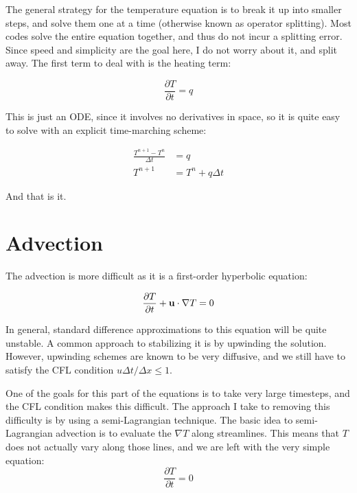 \documentclass[a4paper,10pt]{article}
\begin{document}
The general strategy for the temperature equation is to break it up into smaller steps, and solve them one at a time (otherwise known as operator splitting). 
Most codes solve the entire equation together, and thus do not incur a splitting error.  
Since speed and simplicity are the goal here, I do not worry about it, and split away.  The first term to deal with is the heating term:

\begin{equation}
\frac{\partial T}{\partial t} = q
\end{equation}

This is just an ODE, since it involves no derivatives in space, so it is quite easy to solve with an explicit time-marching scheme:

\begin{equation}
\begin{aligned}
\frac{ T^{n+1} - T^n}{\Delta t} &= q \\
T^{n+1} &= T^n + q \Delta t
\end{aligned}
\end{equation}

And that is it.

\section{Advection}

The advection is more difficult as it is a first-order hyperbolic equation:

\begin{equation}
\frac{\partial T}{\partial t} + {\bf u} \cdot \nabla T = 0
\end{equation}

In general, standard difference approximations to this equation will be quite unstable.
A common approach to stabilizing it is by upwinding the solution.  
However, upwinding schemes are known to be very diffusive, and we still have to satisfy the CFL condition $u \Delta t/\Delta x \le 1$.

One of the goals for this part of the equations is to take very large timesteps, and the CFL condition makes this difficult.
The approach I take to removing this difficulty is by using a semi-Lagrangian technique.
The basic idea to semi-Lagrangian advection is to evaluate the $\nabla T$ along streamlines.  
This means that $T$ does not actually vary along those lines, and we are left with the very simple equation:
\begin{equation}
\frac{\partial T}{\partial t} = 0
\end{equation}
\end{document}
